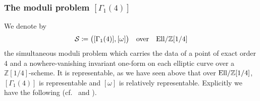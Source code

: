 \documentclass{gtpart}
\theoremstyle{definition}
\theoremstyle{remark}
\newcommand{\mb}[1]{\mathbb{#1}}
\newcommand{\Ell}{{\rm Ell}}
\newcommand{\CS}{{\cal S}}
\newcommand{\BZ}{{\mb Z}}
\newcommand{\G}{\Gamma}
\newcommand{\ce}{\coloneqq}
\numberwithin{equation}{section}
\numberwithin{thm}{section}
\begin{document}
\subsubsection*{The moduli problem $[\G_1(4)]$}

We denote by 
\begin{equation}
\label{CS}
 \CS \ce \big( [\G_1(4)], [\omega] \big) \quad \text{over} \quad 
 \Ell/\BZ[1/4] 
\end{equation}
the simultaneous moduli problem which carries the data of a point of 
exact order 4 and a nowhere-vanishing invariant one-form on each 
elliptic curve over a $\BZ[1/4]$-scheme.  It is representable, as we 
have seen above that over $\Ell/\BZ[1/4]$, $[\G_1(4)]$ is representable 
and $[\omega]$ is relatively representable.  Explicitly we have the 
following (cf.~\cite[4(4.6a)]{husemoller} and 
\cite[Proposition 3.2 and Corollary 3.3]{tmf3}).  
\end{document}
